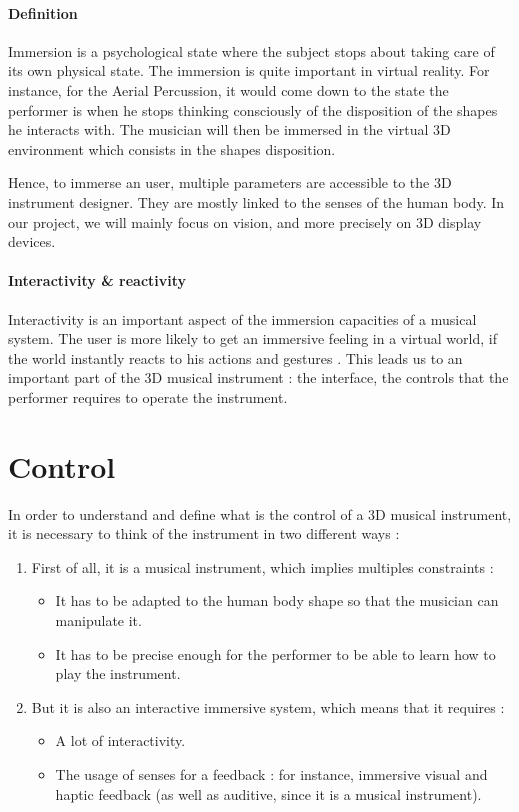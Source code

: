 \paragraph{Definition}
Immersion is a psychological state where the subject stops about taking care of its own physical state.
The immersion is quite important in virtual reality. For instance, for the Aerial Percussion, it would come down to the state the performer is when he stops thinking consciously of the disposition of the shapes he interacts with. The musician will then be immersed in the virtual 3D environment which consists in the shapes disposition.

Hence, to immerse an user, multiple parameters are accessible to the 3D instrument designer. 
They are mostly linked to the senses of the human body. In our project, we will mainly focus on vision, and more precisely on 3D display devices.

\paragraph{Interactivity \& reactivity}
Interactivity is an important aspect of the immersion capacities of a musical system.
The user is more likely to get an immersive feeling in a virtual world, if the world instantly reacts to his actions and gestures \cite{biocca1995immersive}.
This leads us to an important part of the 3D musical instrument : the interface, the controls that the performer requires to operate the instrument.

\section{Control}
In order to understand and define what is the control of a 3D musical instrument, it is necessary to think of the instrument in two different ways : 
\begin{enumerate}
\item First of all, it is a musical instrument, which implies multiples constraints :
\begin{itemize}
\item It has to be adapted to the human body shape so that the musician can manipulate it.
\item It has to be precise enough for the performer to be able to learn how to play the instrument.
\end{itemize}
\item But it is also an interactive immersive system, which means that it requires :
\begin{itemize}
\item A lot of interactivity.
\item The usage of senses for a feedback : for instance, immersive visual and haptic feedback (as well as auditive, since it is a musical instrument).
\end{itemize} 
\end{enumerate}

